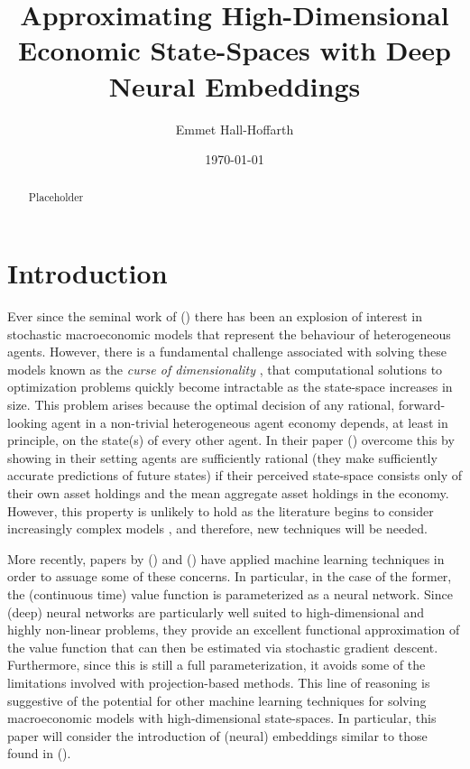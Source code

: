 \documentclass{article}
\title{Approximating High-Dimensional Economic State-Spaces with Deep Neural Embeddings}
\author{Emmet Hall-Hoffarth}
\date{\today}
\begin{document}
\maketitle
    
\begin{abstract}

Placeholder

\end{abstract}


\section{Introduction}

Ever since the seminal work of \citeauthor{krusell1998income} (\citeyear{krusell1998income}) there has been an explosion of interest in stochastic macroeconomic models that represent the behaviour of heterogeneous agents. However, there is a fundamental challenge associated with solving these models known as the \textit{curse of dimensionality} \parencite{dreyfus1962applied}, that computational solutions to optimization problems quickly become intractable as the state-space increases in size. This problem arises because the optimal decision of any rational, forward-looking agent in a non-trivial heterogeneous agent economy depends, at least in principle, on the state(s) of every other agent. In their paper \citeauthor{krusell1998income} (\citeyear{krusell1998income}) overcome this by showing in their setting agents are sufficiently rational (they make sufficiently accurate predictions of future states) if their perceived state-space consists only of their own asset holdings and the mean aggregate asset holdings in the economy. However, this property is unlikely to hold as the literature begins to consider increasingly complex models \parencite{krusell2006quantitative}, and therefore, new techniques will be needed. 

More recently, papers by \citeauthor{duarte2018machine} (\citeyear{duarte2018machine}) and \citeauthor{azinovic2019deep} (\citeyear{azinovic2019deep}) have applied machine learning techniques in order to assuage some of these concerns. In particular, in the case of the former, the (continuous time) value function is parameterized as a neural network. Since (deep) neural networks are particularly well suited to high-dimensional and highly non-linear problems, they provide an excellent functional approximation of the value function that can then be estimated via stochastic gradient descent. Furthermore, since this is still a full parameterization, it avoids some of the limitations involved with projection-based methods. This line of reasoning is suggestive of the potential for other machine learning techniques for solving macroeconomic models with high-dimensional state-spaces. In particular, this paper will consider the introduction of (neural) embeddings similar to those found in \citeauthor{bengio2003neural} (\citeyear{bengio2003neural}). 
\end{document}
